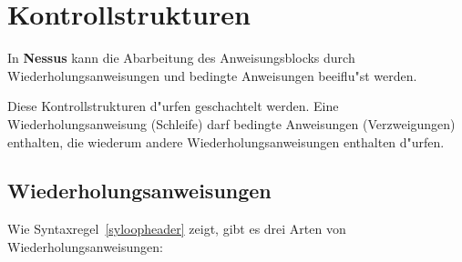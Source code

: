 \section{Kontrollstrukturen}
\label{controlstatements}

In {\bf Nessus} kann die Abarbeitung des Anweisungsblocks durch
Wiederholungsanweisungen
und bedingte Anweisungen beeiflu"st  werden.

\begin{center}
\end{center}

Diese Kontrollstrukturen d"urfen geschachtelt werden. Eine
Wiederholungsanweisung (Schleife) darf bedingte
Anweisungen (Verzweigungen) enthalten, die wiederum andere
Wiederholungsanweisungen
enthalten d"urfen.


\subsection{Wiederholungsanweisungen}
\label{loopstatements}

Wie Syntaxregel~\ref{syloopheader} zeigt, gibt es drei Arten von
Wiederholungsanweisungen: 

